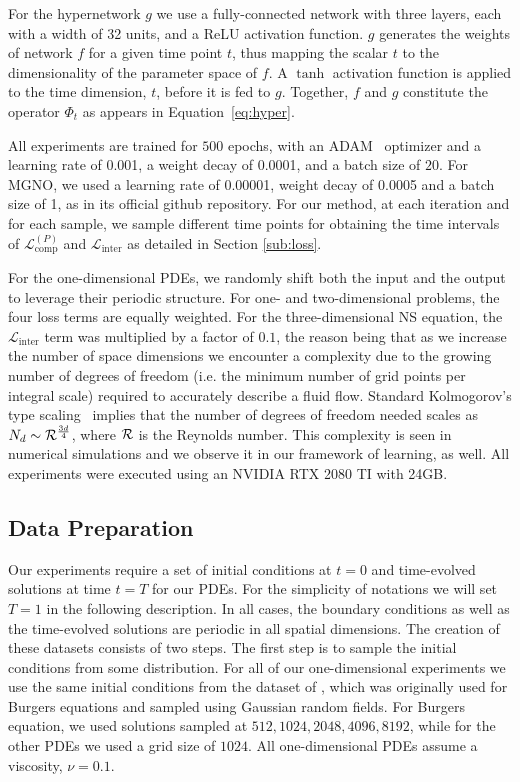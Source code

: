 \documentclass{article}
\theoremstyle{plain}
\theoremstyle{definition}
\theoremstyle{remark}
\newcommand{\lcomp}{{{\mathcal{L}}^{(P)}_{\text{comp}}}}
\newcommand{\linter}{{{\mathcal{L}}_{\text{inter}}}}
\begin{document}
For the hypernetwork $g$ we use a fully-connected network with three layers, each with a width of 32 units, and a ReLU activation function. $g$ generates the weights of network $f$ for a given time point $t$, thus mapping the scalar $t$ to the dimensionality of the parameter space of $f$.  A $\tanh$ activation function is applied to the time dimension,  $t$, before it is fed to $g$. Together, $f$ and $g$ constitute the operator $\Phi_t$ as appears in Equation~\eqref{eq:hyper}. 

All experiments are trained for $500$ epochs, with an ADAM~\cite{kingma2014adam} optimizer and a learning rate of 0.001, a weight decay of 0.0001, and a batch size of $20$. For MGNO, we used a learning rate of 0.00001, weight decay of 0.0005 and a batch size of 1, as in its official github repository. For our method, at each iteration and for each sample, we sample different time points for obtaining the time intervals of $\lcomp$ and $\linter$ as detailed in Section \ref{sub:loss}.

For the one-dimensional PDEs, we randomly shift both the input and the output to leverage their periodic structure. For one- and two-dimensional problems, the four loss terms are equally weighted. For the three-dimensional NS equation, the $\mathcal{L}_{\text{inter}}$ term was multiplied by a factor of $0.1$, the reason being that as we increase
the number of space dimensions we encounter a complexity due to the growing number
of  degrees of freedom (i.e. the minimum number of grid points per integral scale) required to accurately describe 
a fluid flow. Standard Kolmogorov's type scaling~\citep{frisch1995turbulence} implies that the number of degrees of freedom needed scales as $N_{d} \sim {\cal R}^{\frac{3d}{4}}$, where ${\cal R}$
is the Reynolds number. This complexity is seen in numerical simulations and we observe it in our framework
of learning, as well. All experiments were executed using an NVIDIA RTX 2080 TI with 24GB.


\subsection{Data Preparation}
Our experiments require a set of initial conditions at $t=0$ and time-evolved solutions at time $t=T$ for our PDEs.
For the simplicity of notations we will set $T=1$ in the following description. In all cases, the boundary conditions as well as the time-evolved solutions are periodic in all spatial dimensions.
The creation of these datasets consists of two steps. The first step is to sample the initial conditions from some distribution. For all of our one-dimensional experiments we use the same initial conditions from the dataset of \cite{li2020fourier}, which was originally used for Burgers equations and sampled using Gaussian random fields. For Burgers equation, we used solutions sampled at $512,1024,2048,4096,8192$, while for the other PDEs we used a grid size of $1024$. All one-dimensional PDEs assume a viscosity, $\nu=0.1$.
\end{document}
